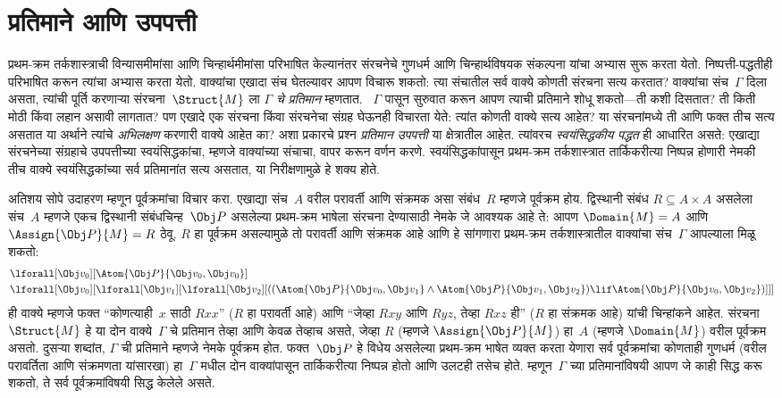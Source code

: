 \section{प्रतिमाने आणि उपपत्ती}\label{fol:int:mod:sec}

प्रथम-क्रम तर्कशास्त्राची विन्यासमीमांसा आणि चिन्हार्थमीमांसा परिभाषित
केल्यानंतर संरचनेचे गुणधर्म आणि चिन्हार्थविषयक संकल्पना यांचा
अभ्यास सुरू करता येतो. निष्पत्ती-पद्धतीही परिभाषित करून त्यांचा
अभ्यास करता येतो. वाक्यांचा एखादा संच घेतल्यावर आपण विचारू
शकतो: त्या संचातील सर्व वाक्ये कोणती संरचना सत्य करतात?
वाक्यांचा संच~$\Gamma$ दिला असता, त्यांची पूर्ति करणाऱ्या
संरचना~$\Struct{M}$ ला \emph{$\Gamma$ चे प्रतिमान} म्हणतात.
~$\Gamma$ पासून सुरुवात करून आपण त्याची प्रतिमाने शोधू शकतो---ती कशी
दिसतात? ती किती मोठी किंवा लहान असावी लागतात? पण एखादे एक
संरचना किंवा संरचनेचा संग्रह घेऊनही विचारता येते: त्यांत
कोणती वाक्ये सत्य आहेत? या संरचनांमध्ये ती आणि फक्त तीच
सत्य असतात या अर्थाने त्यांचे \emph{अभिलक्षण} करणारी वाक्ये आहेत
का? अशा प्रकारचे प्रश्न \emph{प्रतिमान उपपत्ती} या क्षेत्रातील आहेत.
त्यांवरच \emph{स्वयंसिद्धकीय पद्धत} ही आधारित असते: एखाद्या
संरचनेच्या संग्रहाचे उपपत्तीच्या स्वयंसिद्धकांचा, म्हणजे
वाक्यांच्या संचाचा, वापर करून वर्णन करणे. स्वयंसिद्धकांपासून
प्रथम-क्रम तर्कशास्त्रात तार्किकरीत्या निष्पन्न होणारी नेमकी तीच
वाक्ये स्वयंसिद्धकांच्या सर्व प्रतिमानांत सत्य असतात, या
निरीक्षणामुळे हे शक्य होते.

अतिशय सोपे उदाहरण म्हणून पूर्वक्रमांचा विचार करा. एखाद्या संच~$A$ वरील
परावर्ती आणि संक्रमक असा संबंध~$R$ म्हणजे पूर्वक्रम होय. द्विस्थानी
संबंध $R \subseteq A \times A$ असलेला संच~$A$ म्हणजे एकच द्विस्थानी
संबंधचिन्ह~$\Obj P$ असलेल्या प्रथम-क्रम भाषेला संरचना देण्यासाठी
नेमके जे आवश्यक आहे ते: आपण $\Domain{M} = A$ आणि
$\Assign{\Obj P}{M} = R$ ठेवू. $R$ हा पूर्वक्रम असल्यामुळे तो परावर्ती
आणि संक्रमक आहे आणि हे सांगणारा प्रथम-क्रम तर्कशास्त्रातील
वाक्यांचा संच~$\Gamma$ आपल्याला मिळू शकतो:
\begin{align*}
  & \lforall[\Obj v_0][\Atom{\Obj P}{\Obj v_0,\Obj v_0}]\\
  & \lforall[\Obj v_0][\lforall[\Obj v_1][\lforall[\Obj v_2][((\Atom{\Obj P}{\Obj v_0,\Obj v_1} \land \Atom{\Obj P}{\Obj v_1,\Obj v_2}) \lif \Atom{\Obj P}{\Obj v_0,\Obj v_2})]]]
\end{align*}
ही वाक्ये म्हणजे फक्त ``कोणत्याही~$x$ साठी $Rxx$'' ($R$ हा
परावर्ती आहे) आणि ``जेव्हा $Rxy$ आणि $Ryz$, तेव्हा $Rxz$ ही'' ($R$ हा
संक्रमक आहे) यांची चिन्हांकने आहेत. संरचना~$\Struct{M}$ हे या
दोन वाक्ये~$\Gamma$ चे प्रतिमान तेव्हा आणि केवळ तेव्हाच असते,
जेव्हा $R$ (म्हणजे $\Assign{\Obj P}{M}$) हा~$A$ (म्हणजे
$\Domain{M}$) वरील पूर्वक्रम असतो. दुसऱ्या शब्दांत, $\Gamma$ ची प्रतिमाने
म्हणजे नेमके पूर्वक्रम होत. फक्त~$\Obj P$ हे विधेय असलेल्या
प्रथम-क्रम भाषेत व्यक्त करता येणारा सर्व पूर्वक्रमांचा कोणताही गुणधर्म
(वरील परावर्तिता आणि संक्रमणता यांसारखा) हा~$\Gamma$ मधील दोन
वाक्यांपासून तार्किकरीत्या निष्पन्न होतो आणि उलटही तसेच होते.
म्हणून~$\Gamma$ च्या प्रतिमानांविषयी आपण जे काही सिद्ध करू शकतो, ते सर्व
पूर्वक्रमांविषयी सिद्ध केलेले असते.

